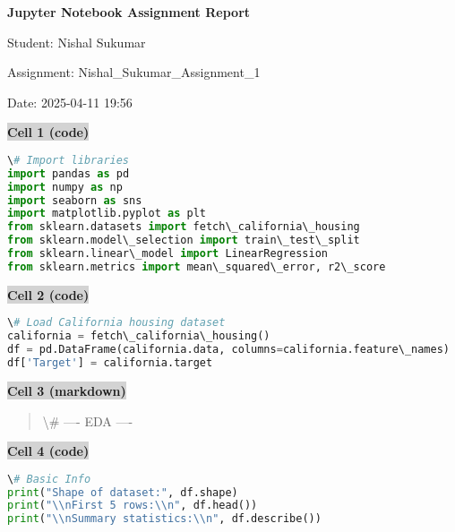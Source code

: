 \documentclass{article}
\begin{document}
\begin{center}
\Large\textbf{Jupyter Notebook Assignment Report}

\vspace{0.5cm}
\normalsize
Student: Nishal Sukumar

Assignment: Nishal_Sukumar_Assignment_1

Date: 2025-04-11 19:56
\end{center}

\vspace{1cm}


\vspace{0.5cm}
\noindent\colorbox{lightgray}{\textbf{Cell 1 (code)}}
\vspace{0.3cm}


\begin{lstlisting}[language=Python]
\# Import libraries
import pandas as pd
import numpy as np
import seaborn as sns
import matplotlib.pyplot as plt
from sklearn.datasets import fetch\_california\_housing
from sklearn.model\_selection import train\_test\_split
from sklearn.linear\_model import LinearRegression
from sklearn.metrics import mean\_squared\_error, r2\_score
\end{lstlisting}


\vspace{0.5cm}
\noindent\colorbox{lightgray}{\textbf{Cell 2 (code)}}
\vspace{0.3cm}


\begin{lstlisting}[language=Python]
\# Load California housing dataset
california = fetch\_california\_housing()
df = pd.DataFrame(california.data, columns=california.feature\_names)
df['Target'] = california.target
\end{lstlisting}


\vspace{0.5cm}
\noindent\colorbox{lightgray}{\textbf{Cell 3 (markdown)}}
\vspace{0.3cm}


\begin{quote}
\textbackslash{}# ---- EDA ----
\end{quote}


\vspace{0.5cm}
\noindent\colorbox{lightgray}{\textbf{Cell 4 (code)}}
\vspace{0.3cm}


\begin{lstlisting}[language=Python]
\# Basic Info
print("Shape of dataset:", df.shape)
print("\\nFirst 5 rows:\\n", df.head())
print("\\nSummary statistics:\\n", df.describe())
\end{lstlisting}
\end{document}
